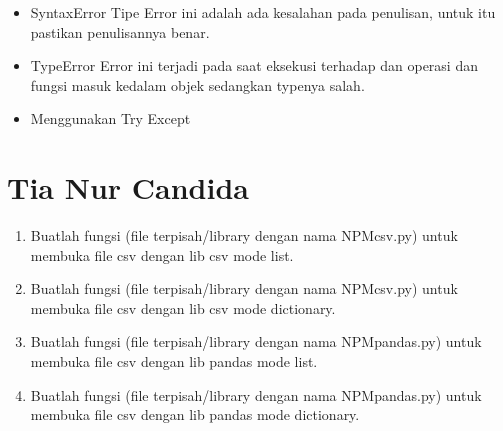 \begin{enumerate}
\begin{itemize}
\item SyntaxError
Tipe Error ini adalah ada kesalahan pada penulisan, untuk itu pastikan penulisannya benar.

\item TypeError
Error ini terjadi pada saat eksekusi terhadap dan operasi dan fungsi masuk kedalam objek sedangkan typenya salah.

\item Menggunakan Try Except 


\end{itemize}



\section{Tia Nur Candida}
\begin{enumerate}
	\item Buatlah  fungsi  (file  terpisah/library  dengan  nama  NPMcsv.py)  untuk  membuka file csv dengan lib csv mode list.
	
	
	
	\item Buatlah  fungsi  (file  terpisah/library  dengan  nama  NPMcsv.py)  untuk  membuka file csv dengan lib csv mode dictionary.
	
	
	
	\item Buatlah fungsi (file terpisah/library dengan nama NPMpandas.py) untuk membuka file csv dengan lib pandas mode list.
	
	
	
	\item Buatlah fungsi (file terpisah/library dengan nama NPMpandas.py) untuk membuka file csv dengan lib pandas mode dictionary.
	
	
	

\end{enumerate}
\end{enumerate}
